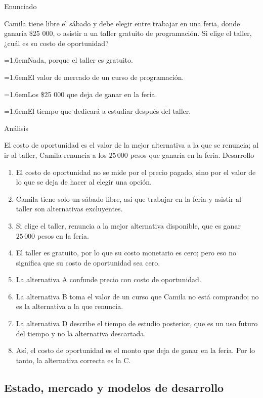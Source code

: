 \documentclass[10pt,a4paper,twocolumn]{article}
\newcommand{\alternativa}[2]{\par\noindent\hangindent=1.6em\hangafter=1\makebox[1.6em][l]{\tecla{#1}}#2\par}
\newcommand{\clave}[1]{\par\smallskip{\sffamily\footnotesize\color{esmeralda} Clave \teclaok{#1}}\par}
\begin{document}
\begin{ejemplo}
{\sffamily\footnotesize\color{zinc500} Enunciado}\par
Camila tiene libre el sábado y debe elegir entre trabajar en una feria, donde ganaría \$25 000, o asistir a un taller gratuito de programación. Si elige el taller, ¿cuál es su costo de oportunidad?
\alternativa{A}{Nada, porque el taller es gratuito.}
\alternativa{B}{El valor de mercado de un curso de programación.}
\alternativa{C}{Los \$25 000 que deja de ganar en la feria.}
\alternativa{D}{El tiempo que dedicará a estudiar después del taller.}
\clave{C}
{\sffamily\footnotesize\color{zinc500} Análisis}\par El costo de oportunidad es el valor de la mejor alternativa a la que se renuncia; al ir al taller, Camila renuncia a los $25\,000$ pesos que ganaría en la feria.
{\sffamily\footnotesize\color{zinc500} Desarrollo}
\begin{enumerate}
  \item El costo de oportunidad no se mide por el precio pagado, sino por el valor de lo que se deja de hacer al elegir una opción.
  \item Camila tiene solo un sábado libre, así que trabajar en la feria y asistir al taller son alternativas excluyentes.
  \item Si elige el taller, renuncia a la mejor alternativa disponible, que es ganar $25\,000$ pesos en la feria.
  \item El taller es gratuito, por lo que su costo monetario es cero; pero eso no significa que su costo de oportunidad sea cero.
  \item La alternativa A confunde precio con costo de oportunidad.
  \item La alternativa B toma el valor de un curso que Camila no está comprando; no es la alternativa a la que renuncia.
  \item La alternativa D describe el tiempo de estudio posterior, que es un uso futuro del tiempo y no la alternativa descartada.
  \item Así, el costo de oportunidad es el monto que deja de ganar en la feria. Por lo tanto, la alternativa correcta es la C.
\end{enumerate}
\end{ejemplo}

\subsection{Estado, mercado y modelos de desarrollo}
\end{document}
